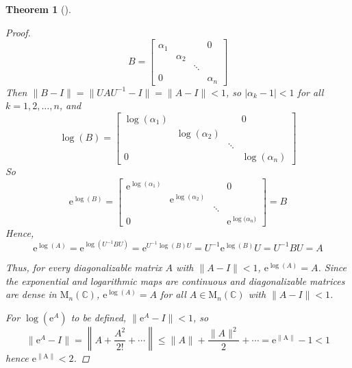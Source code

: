 \documentclass[letterpaper, 10pt]{article}
\theoremstyle{theostyle}
\newtheorem{theorem}{Theorem}[section]
\newenvironment{thmstyle}[1][]{%
    \begin{theorem}[#1]\leavevmode\vspace{-\baselineskip}\myquote%
    }{\endmyquote\end{theorem}}
\begin{document}
\begin{thmstyle}
\begin{proof}
        \[B = 
        \begin{bmatrix}
            \alpha_1 & & & 0 \\
            & \alpha_2 & & \\
            & & \ddots & \\
            0 & & & \alpha_n
        \end{bmatrix}
        \]
        Then \(\lVert B - I \rVert = \lVert UAU^{-1} - I \rVert = \lVert A - I \rVert < 1\), so \(\lvert \alpha_k - 1 \rvert < 1\) for all \(k = 1, 2, \dots, n\), and 
        \[\log{(B)} = 
        \begin{bmatrix}
            \log{(\alpha_1)} & & & 0 \\
            & \log{(\alpha_2)} & & \\
            & & \ddots & \\
            0 & & & \log{(\alpha_n)}
        \end{bmatrix}\]
        So 
        \[\mathrm{e}^{\log{(B)}} = 
        \begin{bmatrix}
            \mathrm{e}^{\log{(\alpha_1)}} & & & 0 \\
            & \mathrm{e}^{\log{(\alpha_2)}} & & \\
            & & \ddots & \\
            0 & & & \mathrm{e}^{\log{(\alpha_n})}
        \end{bmatrix}
        = B\]
        Hence,
        \[\mathrm{e}^{\log{(A)}} = \mathrm{e}^{\log{\left(U^{-1}BU\right)}} = \mathrm{e}^{U^{-1}\log{(B)}U} = U^{-1}\mathrm{e}^{\log{(B)}}U = U^{-1}BU = A\] 

        Thus, for every diagonalizable matrix \(A\) with \(\lVert A - I \rVert < 1\), \(\mathrm{e}^{\log{(A)}} = A\).
        Since the exponential and logarithmic maps are continuous and diagonalizable matrices are dense in \(\mathrm{M}_n(\mathbb{C})\), 
        \(\mathrm{e}^{\log{(A)}} = A\) for all \(A \in \mathrm{M}_n (\mathbb{C})\) with \(\lVert A - I \rVert < 1\).

        For \(\log{\left(\mathrm{e}^A\right)}\) to be defined, \(\lVert \mathrm{e}^A - I \rVert < 1\), so
        \[\lVert \mathrm{e}^A - I \rVert = \left\lVert A + \frac{A^2}{2!} + \cdots \right\rVert \leq \lVert A \rVert + \frac{\lVert A \rVert^2}{2} + \cdots = \mathrm{e^{\lVert A \rVert}} - 1 < 1\]
        hence \(\mathrm{e^{\lVert A \rVert}} < 2\).


\end{proof}
\end{thmstyle}
\end{document}
